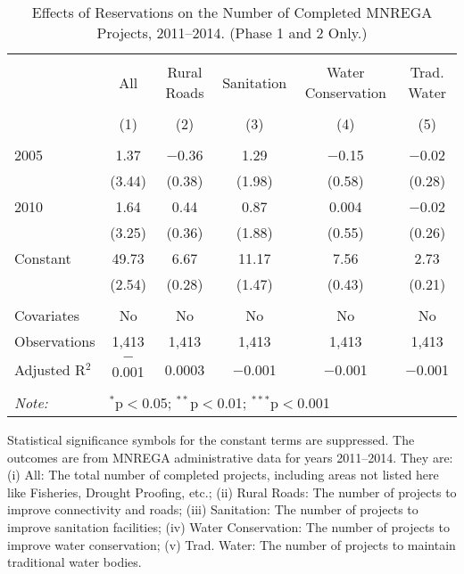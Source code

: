 \begin{table}[!htbp]
\centering
\begin{threeparttable}

  \caption{Effects of Reservations on the Number of Completed MNREGA Projects, 2011--2014. (Phase 1 and 2 Only.)} 
  \label{main_mnrega_phase_1_2} 
\scriptsize 
\begin{tabular}{@{\extracolsep{0pt}}lccccc} 
\\[-1.8ex]\hline 
\hline \\[-1.8ex] 
 & All & Rural Roads & Sanitation & Water Conservation & Trad. Water \\ 
\\[-1.8ex] & (1) & (2) & (3) & (4) & (5)\\ 
\hline \\[-1.8ex] 
 2005 & 1.37 & $-$0.36 & 1.29 & $-$0.15 & $-$0.02 \\ 
  & (3.44) & (0.38) & (1.98) & (0.58) & (0.28) \\ 
  2010 & 1.64 & 0.44 & 0.87 & 0.004 & $-$0.02 \\ 
  & (3.25) & (0.36) & (1.88) & (0.55) & (0.26) \\ 
  Constant & 49.73 & 6.67 & 11.17 & 7.56 & 2.73 \\ 
  & (2.54) & (0.28) & (1.47) & (0.43) & (0.21) \\ 
 \hline \\[-1.8ex] 
Covariates & No & No & No & No & No \\ 
Observations & 1,413 & 1,413 & 1,413 & 1,413 & 1,413 \\ 
Adjusted R$^{2}$ & $-$0.001 & 0.0003 & $-$0.001 & $-$0.001 & $-$0.001 \\ 
\hline 
\hline \\[-1.8ex] 
\textit{Note:}  & \multicolumn{5}{l}{$^{*}$p$<$0.05; $^{**}$p$<$0.01; $^{***}$p$<$0.001} \\ 
\end{tabular} 
\begin{tablenotes}[flushleft]
\scriptsize
\item[] Statistical significance symbols for the constant terms are suppressed. The outcomes are from MNREGA administrative data for years 2011--2014. They are: 
(i) All: The total number of completed projects, including areas not listed here like Fisheries, Drought Proofing, etc.;
(ii) Rural Roads: The number of projects to improve connectivity and roads;
(iii) Sanitation: The number of projects to improve sanitation facilities;
(iv) Water Conservation: The number of projects to improve water conservation;
(v) Trad. Water: The number of projects to maintain traditional water bodies.
\end{tablenotes}
\end{threeparttable}
\end{table}
